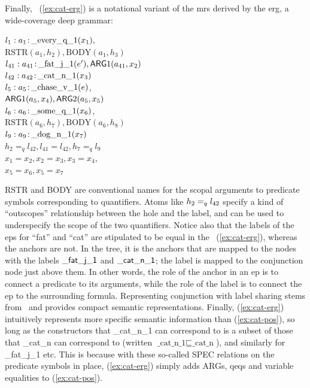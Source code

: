 Finally, \rmrs\ (\ref{ex:cat-erg}) is a notational variant of the {\sc
  mrs} derived by the {\sc erg}, a wide-coverage deep grammar:
\begin{examples}
\item $l_1:a_1\colon\!\mbox{\_every\_q\_1}(x_1),$\\
\hspace*{0.1in}$\mbox{RSTR}(a_1,h_2),
\mbox{BODY}(a_1,h_3)$\\ 
$l_{41}:a_{41}\colon\!\mbox{\_fat\_j\_1}(e'), \mathsf{ARG}1(a_{41},x_2)$\\
$l_{42}:a_{42}\colon\!\mbox{\_cat\_n\_1}(x_3)$\\
$l_5:a_5\colon\!\mbox{\_chase\_v\_1}(e)$,\\
\hspace*{0.1in}$\mathsf{ARG}1(a_5,x_4),
\mathsf{ARG}2(a_5,x_5)$\\ 
$l_6:a_6\colon\!\mbox{\_some\_q\_1}(x_6)$,\\
\hspace*{0.1in}$\mbox{RSTR}(a_6,h_7),
\mbox{BODY}(a_6,h_8)$\\ 
$l_9:a_9\colon\!\mbox{\_dog\_n\_1}(x_7)$\\
$h_2=_q l_{42}, l_{41}=l_{42}, h_7 =_q l_9$\\
$x_1=x_2, x_2=x_3, x_3=x_4,$\\
$x_5=x_6, x_5=x_7$
\label{ex:cat-erg}
\end{examples}
RSTR and BODY are conventional names for the scopal arguments to
predicate symbols corresponding to quantifiers.   
Atoms like $h_2 =_q l_{42}$ specify
a kind of ``outscopes'' relationship between the hole and the label,
and can be used to underspecify the scope of the two quantifiers.
Notice also that the labels of the {\sc ep}s for ``fat'' and ``cat'' are
stipulated to be equal in the \rmrs\ (\ref{ex:cat-erg}), whereas the
anchors are not. 
In the tree, it is the anchors that are mapped to the nodes with the
labels $\mathsf{\_fat\_j\_1}$ and $\mathsf{\_cat\_n\_1}$; the label is
mapped to the conjunction node just above them.  In other words, the
role of the anchor in an {\sc ep} is to connect a predicate to its
arguments, while the role of the label is to connect the {\sc ep} to the
surrounding formula.  Representing conjunction with label sharing
stems from \mrs\ and provides compact semantic representations.
Finally, (\ref{ex:cat-erg}) intuitively represents more specific
semantic information than (\ref{ex:cat-pos}), so long as
the constructors that \_cat\_n\_1 can correspond to is a
subset of those that \_cat\_n can correspond to (written
$\mbox{\_cat\_n\_1}\sqsubseteq \mbox{\_cat\_n}$), and similarly for
\_fat\_j\_1 etc.  This is because with these so-called SPEC relations
on the predicate symbols in place, (\ref{ex:cat-erg}) simply adds
ARGs, qeqs and variable equalities to (\ref{ex:cat-pos}).

